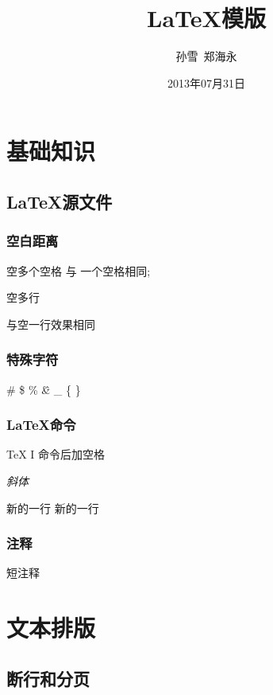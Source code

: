 \documentclass[a4paper,12pt]{article}
\title{\LaTeX{}模版} %
\author{孙雪\ 郑海永}  %
\date{2013年07月31日} %
\begin{document}
\maketitle
\tableofcontents %

\section{基础知识}

\subsection{\LaTeX{}源文件}

\subsubsection{空白距离}

空多个空格 与   一个空格相同;%

空多行


与空一行效果相同  %

\subsubsection{特殊字符}

\# \$ \% \^ \& \_ \{ \} %

\subsubsection{\LaTeX{}命令}

\TeX{} I 命令后加空格 %

\textsl{斜体} %

新的一行 \newline 新的一行

\subsubsection{注释}

短注释 %
\begin{comment}
balala
\end{comment}   %

\section{文本排版}

\subsection{断行和分页}
\end{document}
